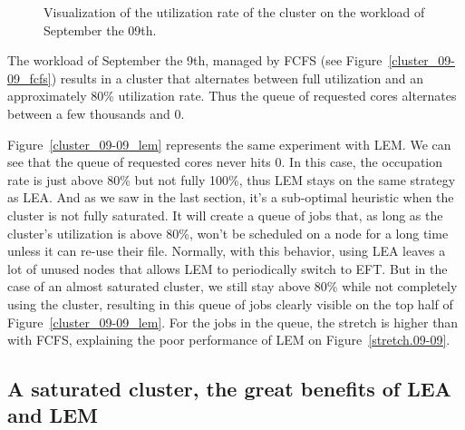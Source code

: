 \documentclass[conference,10pt]{IEEEtran}
\begin{document}
\begin{figure}[tb]
\begin{subfigure}[b]{0.49\linewidth}
\end{subfigure}
\caption{Visualization of the utilization rate of the cluster on the workload of September the 09th.}\end{figure}

The workload of September the 9th, managed by FCFS (see Figure~\ref{cluster_09-09_fcfs})
results in a cluster that alternates between full utilization and an approximately 80\% utilization rate.
Thus the queue of requested cores alternates between a few thousands and 0.

Figure~\ref{cluster_09-09_lem} represents the same experiment with LEM.
We can see that the queue of requested cores never hits 0.
In this case, the occupation rate is just above 80\% but not fully 100\%, thus LEM stays on the same strategy as LEA.
And as we saw in the last section, it's a sub-optimal heuristic when the cluster is not fully saturated.
It will create a queue of jobs that, as long as the cluster's utilization is above 80\%, won't
be scheduled on a node for a long time unless it can re-use their file.
Normally, with this behavior, using LEA leaves a lot of unused nodes that allows LEM
to periodically switch to EFT. But in the case of an almost 
saturated cluster, we still stay above 80\% while not completely using the cluster,
resulting in this queue of jobs clearly visible on the top half of Figure~\ref{cluster_09-09_lem}.
For the jobs in the queue, the stretch is higher than with FCFS, explaining the poor performance of
LEM on Figure~\ref{stretch.09-09}.

\subsection{A saturated cluster, the great benefits of LEA and LEM}\label{sec.03-26}
\end{document}
